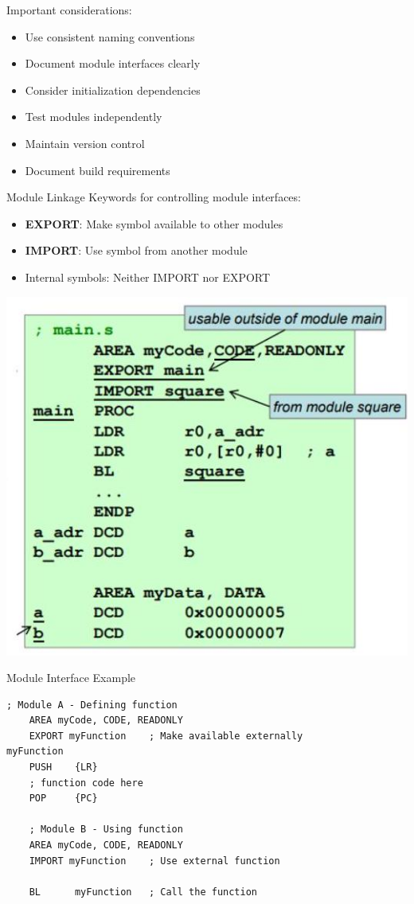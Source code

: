 \begin{remark}
Important considerations:
\begin{itemize}
  \item Use consistent naming conventions
  \item Document module interfaces clearly
  \item Consider initialization dependencies
  \item Test modules independently
  \item Maintain version control
  \item Document build requirements
\end{itemize}
\end{remark}





\begin{definition}{Module Linkage}
Keywords for controlling module interfaces:
\begin{itemize}
  \item \textbf{EXPORT}: Make symbol available to other modules
  \item \textbf{IMPORT}: Use symbol from another module
  \item Internal symbols: Neither IMPORT nor EXPORT
\end{itemize}

\includegraphics[width=0.7\linewidth]{images/2024_12_29_79e6b22f503fb7b4f718g-10(1)}
\end{definition}

\begin{example2}{Module Interface Example}
\begin{lstlisting}[language=armasm, style=basesmol]
    ; Module A - Defining function
    AREA myCode, CODE, READONLY
    EXPORT myFunction    ; Make available externally
myFunction
    PUSH    {LR}
    ; function code here
    POP     {PC}
    
    ; Module B - Using function
    AREA myCode, CODE, READONLY
    IMPORT myFunction    ; Use external function
    
    BL      myFunction   ; Call the function
\end{lstlisting}
\end{example2}


